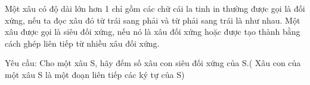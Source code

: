 Một xâu có độ dài lớn hơn 1 chỉ gồm các chữ cái la tinh in thường được gọi là đối xứng, nếu ta đọc xâu đó từ trái sang phải và từ phải sang trái là như nhau. Một xâu được gọi là siêu đối xứng, nếu nó là xâu đối xứng hoặc được tạo thành bằng cách ghép liên tiếp từ nhiều xâu đối xứng.  

   Yêu cầu: Cho một xâu S, hãy đếm số xâu con siêu đối xứng của S.( Xâu con của một xâu S là một đoạn liên tiếp các ký tự của S)
